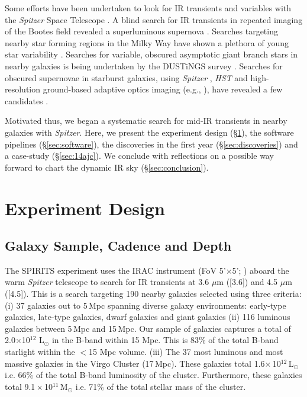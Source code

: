 \documentclass[twocolumn,times]{aastex6}
\begin{document}
Some efforts have been undertaken to look for IR transients and variables with the {\it Spitzer} Space Telescope \citep{Werner2004,Gehrz2007}.
A blind search for IR transients in repeated imaging of the Bootes field revealed a superluminous supernova \citep{Kozlowski2010}.
Searches targeting nearby star forming regions in the Milky Way have shown a plethora of young star variability \citep{Cody2014,Rebull2014}. 
Searches for variable, obscured asymptotic giant branch stars in nearby galaxies is being undertaken by the DUSTiNGS survey \citep{Boyer2015}.
Searches for obscured supernovae in starburst galaxies, using  {\it Spitzer} \citep{Fox2012}, {\it HST} \citep{Cresci2007} and high-resolution
ground-based adaptive optics imaging (e.g., \citealt{Mattila2007}), have revealed a few candidates \citep{Kankare2008,Kankare2012}. 

Motivated thus, we began a systematic search for mid-IR transients in 
nearby galaxies with {\it Spitzer}.  Here, we present the experiment design (\S\ref{sec:experiment}), 
the software pipelines (\S\ref{sec:software}), the discoveries in the first year (\S\ref{sec:discoveries})
and a case-study (\S\ref{sec:14ajc}). We conclude with reflections on a possible way forward to chart 
the dynamic IR sky (\S\ref{sec:conclusion}). 

\section{Experiment Design}
\label{sec:experiment}

\subsection{Galaxy Sample, Cadence and Depth}

The SPIRITS experiment uses the IRAC instrument (FoV 5'$\times$5'; \citealt{Fazio2004}) aboard 
the warm {\it Spitzer} telescope to search for IR transients at 3.6 $\mu$m  ([3.6]) and 4.5 $\mu$m ([4.5]). 
This is a search targeting 190 nearby galaxies selected using three criteria:
(i) 37 galaxies out to 5\,Mpc spanning diverse galaxy 
environments: early-type galaxies, late-type galaxies, dwarf galaxies and giant galaxies 
(ii) 116 luminous galaxies between 5\,Mpc and 15\,Mpc. Our sample of galaxies captures a total of 
2.0$\times$10$^{12}$ L$_{\odot}$ in the B-band within 15 Mpc. This is 83\% of the total B-band starlight within the $<$15 Mpc volume.
(iii) The 37 most luminous and most massive galaxies in the Virgo Cluster (17\,Mpc). These galaxies total
 1.6$\times$\,10$^{12}$\,L$_{\odot}$ i.e. 66\% of the total B-band luminosity of the cluster. Furthermore, these 
 galaxies total 9.1\,$\times$\,10$^{11}$\,M$_{\odot}$ i.e. 71\% of the total stellar mass of the cluster. 
\end{document}
